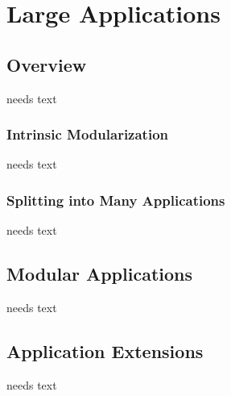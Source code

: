 \documentclass[a4paper,10pt,twoside]{book}
\begin{document}
  \sloppy
\fi


\chapter{Large Applications}

\section{Overview}
needs text

\subsection{Intrinsic Modularization}
needs text

\subsection{Splitting into Many Applications}
needs text

\section{Modular Applications}
needs text

\section{Application Extensions}
needs text




\ifx\wholebook\relax\else
   
   
\end{document}
